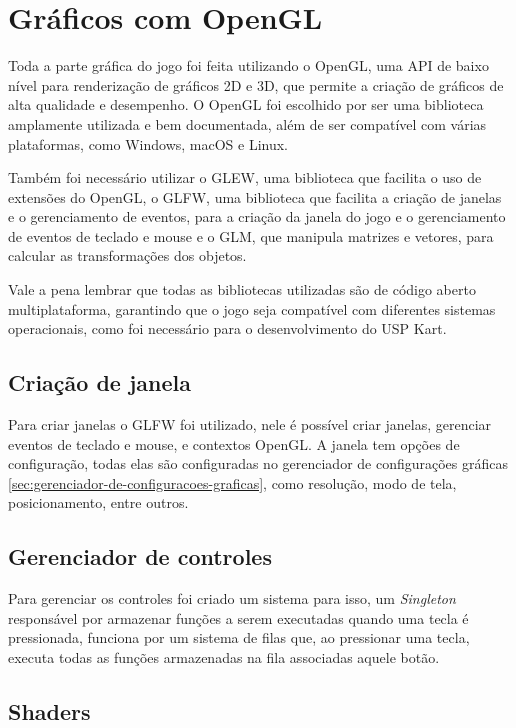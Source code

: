 \section{Gráficos com OpenGL}

Toda a parte gráfica do jogo foi feita utilizando o OpenGL, uma API de baixo nível para renderização de gráficos 2D e 3D, que permite a criação de gráficos de alta qualidade e desempenho. O OpenGL foi escolhido por ser uma biblioteca amplamente utilizada e bem documentada, além de ser compatível com várias plataformas, como Windows, macOS e Linux.

Também foi necessário utilizar o GLEW, uma biblioteca que facilita o uso de extensões do OpenGL, o GLFW, uma biblioteca que facilita a criação de janelas e o gerenciamento de eventos, para a criação da janela do jogo e o gerenciamento de eventos de teclado e mouse e o GLM, que manipula matrizes e vetores, para calcular as transformações dos objetos.

Vale a pena lembrar que todas as bibliotecas utilizadas são de código aberto multiplataforma, garantindo que o jogo seja compatível com diferentes sistemas operacionais, como foi necessário para o desenvolvimento do USP Kart.

\subsection{Criação de janela}

Para criar janelas o GLFW foi utilizado, nele é possível criar janelas, gerenciar eventos de teclado e mouse, e  contextos OpenGL. A janela tem opções de configuração, todas elas são configuradas no gerenciador de configurações gráficas \ref{sec:gerenciador-de-configuracoes-graficas}, como resolução, modo de tela, posicionamento, entre outros.

\subsection{Gerenciador de controles}\label{sec:gerenciador-de-controles}

Para gerenciar os controles foi criado um sistema para isso, um \textit{Singleton} responsável por armazenar funções a serem executadas quando uma tecla é pressionada, funciona por um sistema de filas que, ao pressionar uma tecla, executa todas as funções armazenadas na fila associadas aquele botão.

\subsection{Shaders}

